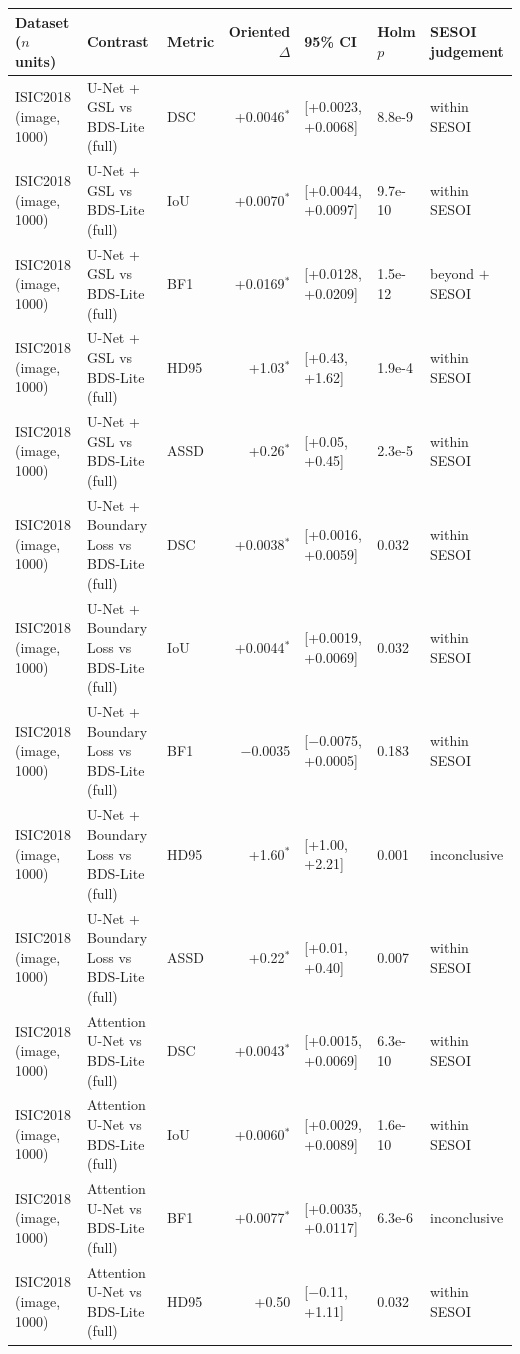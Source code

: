 \begin{tabular}{lllrlll}
\toprule
Dataset ($n$ units) & Contrast & Metric & Oriented $\Delta$ & 95\% CI & Holm $p$ & SESOI judgement \\
\midrule
ISIC2018 (image, 1000) & U-Net + GSL vs BDS-Lite (full) & DSC & +0.0046$^{*}$ & [+0.0023, +0.0068] & 8.8e-9 & within SESOI \\
ISIC2018 (image, 1000) & U-Net + GSL vs BDS-Lite (full) & IoU & +0.0070$^{*}$ & [+0.0044, +0.0097] & 9.7e-10 & within SESOI \\
ISIC2018 (image, 1000) & U-Net + GSL vs BDS-Lite (full) & BF1 & +0.0169$^{*}$ & [+0.0128, +0.0209] & 1.5e-12 & beyond $+$SESOI \\
ISIC2018 (image, 1000) & U-Net + GSL vs BDS-Lite (full) & HD95 & +1.03$^{*}$ & [+0.43, +1.62] & 1.9e-4 & within SESOI \\
ISIC2018 (image, 1000) & U-Net + GSL vs BDS-Lite (full) & ASSD & +0.26$^{*}$ & [+0.05, +0.45] & 2.3e-5 & within SESOI \\
ISIC2018 (image, 1000) & U-Net + Boundary Loss vs BDS-Lite (full) & DSC & +0.0038$^{*}$ & [+0.0016, +0.0059] & 0.032 & within SESOI \\
ISIC2018 (image, 1000) & U-Net + Boundary Loss vs BDS-Lite (full) & IoU & +0.0044$^{*}$ & [+0.0019, +0.0069] & 0.032 & within SESOI \\
ISIC2018 (image, 1000) & U-Net + Boundary Loss vs BDS-Lite (full) & BF1 & $-$0.0035 & [$-$0.0075, +0.0005] & 0.183 & within SESOI \\
ISIC2018 (image, 1000) & U-Net + Boundary Loss vs BDS-Lite (full) & HD95 & +1.60$^{*}$ & [+1.00, +2.21] & 0.001 & inconclusive \\
ISIC2018 (image, 1000) & U-Net + Boundary Loss vs BDS-Lite (full) & ASSD & +0.22$^{*}$ & [+0.01, +0.40] & 0.007 & within SESOI \\
ISIC2018 (image, 1000) & Attention U-Net vs BDS-Lite (full) & DSC & +0.0043$^{*}$ & [+0.0015, +0.0069] & 6.3e-10 & within SESOI \\
ISIC2018 (image, 1000) & Attention U-Net vs BDS-Lite (full) & IoU & +0.0060$^{*}$ & [+0.0029, +0.0089] & 1.6e-10 & within SESOI \\
ISIC2018 (image, 1000) & Attention U-Net vs BDS-Lite (full) & BF1 & +0.0077$^{*}$ & [+0.0035, +0.0117] & 6.3e-6 & inconclusive \\
ISIC2018 (image, 1000) & Attention U-Net vs BDS-Lite (full) & HD95 & +0.50 & [$-$0.11, +1.11] & 0.032 & within SESOI \\

\end{tabular}
